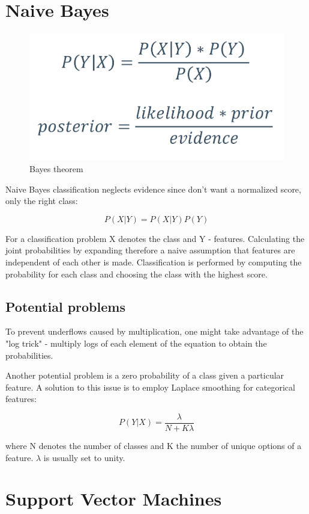 \documentclass[11pt]{book}
\begin{document}
\section{Naive Bayes}

\begin{figure}[H]
    \centering
    \includegraphics[width=0.5\linewidth]{bayes.PNG}
    \caption{Bayes theorem}
    \label{fig:my_label}
\end{figure}

Naive Bayes classification neglects evidence since don't want a normalized score, only the right class:

\begin{equation}
    P(X|Y)=P(X|Y) P(Y)
\end{equation}

For a classification problem X denotes the class and Y - features. Calculating the joint probabilities by expanding therefore a naive assumption that features are independent of each other is made. Classification is performed by computing the probability for each class and choosing the class with the highest score.

\subsection{Potential problems}

To prevent underflows caused by multiplication, one might take advantage of the "log trick" - multiply logs of each element of the equation to obtain the probabilities. 

Another potential problem is a zero probability of a class given a particular feature. A solution to this issue is to employ Laplace smoothing for categorical features:

\begin{equation}
    P(Y|X) = \frac{\lambda}{N + K\lambda}
\end{equation}

where N denotes the number of classes and K the number of unique options of a feature. $\lambda$ is usually set to unity.

\section{Support Vector Machines}
\end{document}

